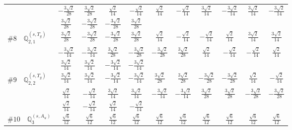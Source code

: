\documentclass[fleqn,9pt,landscape]{jsarticle}
\begin{document}
\begin{center}
\begin{longtable}{lcccccccccc}
& $ - \frac{3 \sqrt{2}}{28} $ & $ \frac{3 \sqrt{2}}{28} $ & $ \frac{\sqrt{2}}{14} $ & $ - \frac{\sqrt{2}}{14} $ & $ \frac{\sqrt{2}}{14} $ & $ - \frac{\sqrt{2}}{14} $ & $ \frac{3 \sqrt{2}}{14} $ & $ - \frac{3 \sqrt{2}}{14} $ & $ \frac{3 \sqrt{2}}{14} $ & $ - \frac{3 \sqrt{2}}{14} $ \\
& $ \frac{3 \sqrt{2}}{28} $ & $ - \frac{3 \sqrt{2}}{28} $ & $ - \frac{3 \sqrt{2}}{28} $ & $ \frac{3 \sqrt{2}}{28} $ & $  $ & $  $ & $  $ & $  $ & $  $ & $  $ \\ \hline
$ \#8\quad \mathbb{Q}_{2,1}^{(s,T_{g})} $ & $ \frac{3 \sqrt{2}}{28} $ & $ - \frac{3 \sqrt{2}}{28} $ & $ - \frac{3 \sqrt{2}}{28} $ & $ \frac{3 \sqrt{2}}{28} $ & $ \frac{\sqrt{2}}{14} $ & $ - \frac{\sqrt{2}}{14} $ & $ - \frac{\sqrt{2}}{14} $ & $ \frac{\sqrt{2}}{14} $ & $ \frac{3 \sqrt{2}}{14} $ & $ \frac{3 \sqrt{2}}{14} $ \\
& $ - \frac{3 \sqrt{2}}{14} $ & $ - \frac{3 \sqrt{2}}{14} $ & $ \frac{3 \sqrt{2}}{28} $ & $ - \frac{3 \sqrt{2}}{28} $ & $ - \frac{3 \sqrt{2}}{28} $ & $ \frac{3 \sqrt{2}}{28} $ & $ \frac{\sqrt{2}}{14} $ & $ - \frac{\sqrt{2}}{14} $ & $ - \frac{\sqrt{2}}{14} $ & $ \frac{\sqrt{2}}{14} $ \\
& $ \frac{3 \sqrt{2}}{14} $ & $ \frac{3 \sqrt{2}}{14} $ & $ - \frac{3 \sqrt{2}}{14} $ & $ - \frac{3 \sqrt{2}}{14} $ & $  $ & $  $ & $  $ & $  $ & $  $ & $  $ \\ \hline
$ \#9\quad \mathbb{Q}_{2,2}^{(s,T_{g})} $ & $ \frac{3 \sqrt{2}}{14} $ & $ \frac{3 \sqrt{2}}{14} $ & $ - \frac{3 \sqrt{2}}{14} $ & $ - \frac{3 \sqrt{2}}{14} $ & $ \frac{3 \sqrt{2}}{28} $ & $ \frac{3 \sqrt{2}}{28} $ & $ - \frac{3 \sqrt{2}}{28} $ & $ - \frac{3 \sqrt{2}}{28} $ & $ \frac{\sqrt{2}}{14} $ & $ - \frac{\sqrt{2}}{14} $ \\
& $ \frac{\sqrt{2}}{14} $ & $ - \frac{\sqrt{2}}{14} $ & $ \frac{3 \sqrt{2}}{14} $ & $ \frac{3 \sqrt{2}}{14} $ & $ - \frac{3 \sqrt{2}}{14} $ & $ - \frac{3 \sqrt{2}}{14} $ & $ \frac{3 \sqrt{2}}{28} $ & $ \frac{3 \sqrt{2}}{28} $ & $ - \frac{3 \sqrt{2}}{28} $ & $ - \frac{3 \sqrt{2}}{28} $ \\
& $ \frac{\sqrt{2}}{14} $ & $ - \frac{\sqrt{2}}{14} $ & $ \frac{\sqrt{2}}{14} $ & $ - \frac{\sqrt{2}}{14} $ & $  $ & $  $ & $  $ & $  $ & $  $ & $  $ \\ \hline
$ \#10\quad \mathbb{Q}_{3}^{(s,A_{u})} $ & $ \frac{\sqrt{6}}{12} $ & $ \frac{\sqrt{6}}{12} $ & $ \frac{\sqrt{6}}{12} $ & $ \frac{\sqrt{6}}{12} $ & $ \frac{\sqrt{6}}{12} $ & $ \frac{\sqrt{6}}{12} $ & $ \frac{\sqrt{6}}{12} $ & $ \frac{\sqrt{6}}{12} $ & $ \frac{\sqrt{6}}{12} $ & $ \frac{\sqrt{6}}{12} $ \\

\end{longtable}
\end{center}
\end{document}
